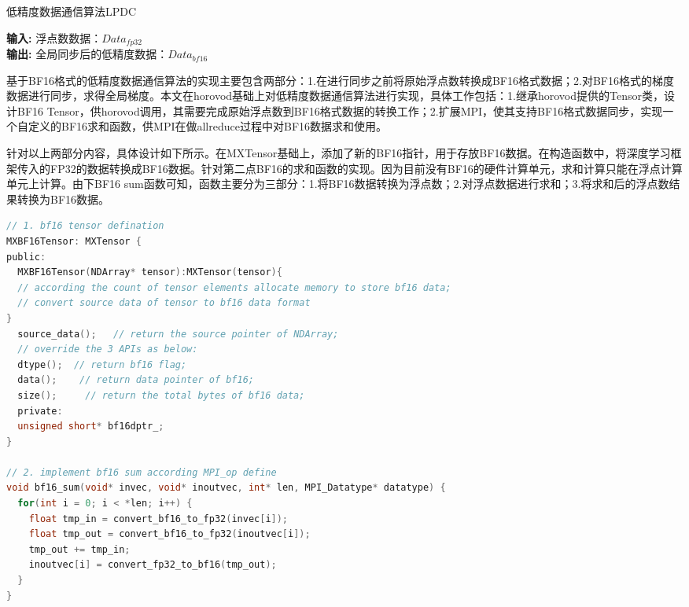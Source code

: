 \begin{algorithm}\small
\caption{低精度数据通信算法LPDC}
\textbf{输入:}
浮点数数据：$Data_{fp32}$ \\
\textbf{输出:} 
全局同步后的低精度数据：$Data_{bf16}$
\begin{algorithmic}[1]
\end{algorithmic}
	\label{alg:lpdc_alg}
\end{algorithm}

基于BF16格式的低精度数据通信算法的实现主要包含两部分：1.在进行同步之前将原始浮点数转换成BF16格式数据；2.对BF16格式的梯度数据进行同步，求得全局梯度。本文在horovod基础上对低精度数据通信算法进行实现，具体工作包括：1.继承horovod提供的Tensor类，设计BF16 Tensor，供horovod调用，其需要完成原始浮点数到BF16格式数据的转换工作；2.扩展MPI，使其支持BF16格式数据同步，实现一个自定义的BF16求和函数，供MPI在做allreduce过程中对BF16数据求和使用。

针对以上两部分内容，具体设计如下所示。在MXTensor基础上，添加了新的BF16指针，用于存放BF16数据。在构造函数中，将深度学习框架传入的FP32的数据转换成BF16数据。针对第二点BF16的求和函数的实现。因为目前没有BF16的硬件计算单元，求和计算只能在浮点计算单元上计算。由下BF16 sum函数可知，函数主要分为三部分：1.将BF16数据转换为浮点数；2.对浮点数据进行求和；3.将求和后的浮点数结果转换为BF16数据。

\begin{lstlisting}[language=C, numbers=none]
// 1. bf16 tensor defination
MXBF16Tensor: MXTensor {
public:
  MXBF16Tensor(NDArray* tensor):MXTensor(tensor){
  // according the count of tensor elements allocate memory to store bf16 data;
  // convert source data of tensor to bf16 data format
}
  source_data();   // return the source pointer of NDArray;
  // override the 3 APIs as below:
  dtype();  // return bf16 flag;
  data();    // return data pointer of bf16;
  size();     // return the total bytes of bf16 data;
  private:
  unsigned short* bf16dptr_;
}

// 2. implement bf16 sum according MPI_op define
void bf16_sum(void* invec, void* inoutvec, int* len, MPI_Datatype* datatype) {
  for(int i = 0; i < *len; i++) {
    float tmp_in = convert_bf16_to_fp32(invec[i]);
    float tmp_out = convert_bf16_to_fp32(inoutvec[i]);
    tmp_out += tmp_in;
    inoutvec[i] = convert_fp32_to_bf16(tmp_out);
  }
}
\end{lstlisting}


